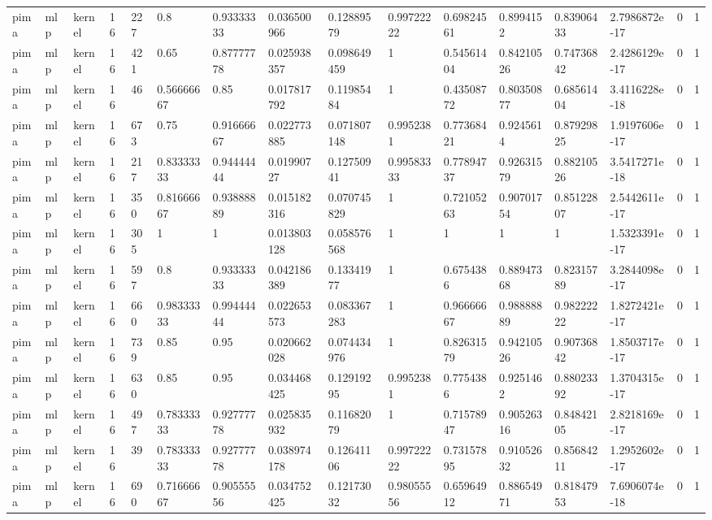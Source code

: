 \begin{tabular}{llllllllllllllll}
pima & mlp & kernel & 16 & 227 & 0.8 & 0.93333333 & 0.036500966 & 0.12889579 & 0.99722222 & 0.69824561 & 0.8994152 & 0.83906433 & 2.7986872e-17 & 0 & 1 \\
pima & mlp & kernel & 16 & 421 & 0.65 & 0.87777778 & 0.025938357 & 0.098649459 & 1 & 0.54561404 & 0.84210526 & 0.74736842 & 2.4286129e-17 & 0 & 1 \\
pima & mlp & kernel & 16 & 46 & 0.56666667 & 0.85 & 0.017817792 & 0.11985484 & 1 & 0.43508772 & 0.80350877 & 0.68561404 & 3.4116228e-18 & 0 & 1 \\
pima & mlp & kernel & 16 & 673 & 0.75 & 0.91666667 & 0.022773885 & 0.071807148 & 0.9952381 & 0.77368421 & 0.9245614 & 0.87929825 & 1.9197606e-17 & 0 & 1 \\
pima & mlp & kernel & 16 & 217 & 0.83333333 & 0.94444444 & 0.01990727 & 0.12750941 & 0.99583333 & 0.77894737 & 0.92631579 & 0.88210526 & 3.5417271e-18 & 0 & 1 \\
pima & mlp & kernel & 16 & 350 & 0.81666667 & 0.93888889 & 0.015182316 & 0.070745829 & 1 & 0.72105263 & 0.90701754 & 0.85122807 & 2.5442611e-17 & 0 & 1 \\
pima & mlp & kernel & 16 & 305 & 1 & 1 & 0.013803128 & 0.058576568 & 1 & 1 & 1 & 1 & 1.5323391e-17 & 0 & 1 \\
pima & mlp & kernel & 16 & 597 & 0.8 & 0.93333333 & 0.042186389 & 0.13341977 & 1 & 0.6754386 & 0.88947368 & 0.82315789 & 3.2844098e-17 & 0 & 1 \\
pima & mlp & kernel & 16 & 660 & 0.98333333 & 0.99444444 & 0.022653573 & 0.083367283 & 1 & 0.96666667 & 0.98888889 & 0.98222222 & 1.8272421e-17 & 0 & 1 \\
pima & mlp & kernel & 16 & 739 & 0.85 & 0.95 & 0.020662028 & 0.074434976 & 1 & 0.82631579 & 0.94210526 & 0.90736842 & 1.8503717e-17 & 0 & 1 \\
pima & mlp & kernel & 16 & 630 & 0.85 & 0.95 & 0.034468425 & 0.12919295 & 0.9952381 & 0.7754386 & 0.9251462 & 0.88023392 & 1.3704315e-17 & 0 & 1 \\
pima & mlp & kernel & 16 & 497 & 0.78333333 & 0.92777778 & 0.025835932 & 0.11682079 & 1 & 0.71578947 & 0.90526316 & 0.84842105 & 2.8218169e-17 & 0 & 1 \\
pima & mlp & kernel & 16 & 39 & 0.78333333 & 0.92777778 & 0.038974178 & 0.12641106 & 0.99722222 & 0.73157895 & 0.91052632 & 0.85684211 & 1.2952602e-17 & 0 & 1 \\
pima & mlp & kernel & 16 & 690 & 0.71666667 & 0.90555556 & 0.034752425 & 0.12173032 & 0.98055556 & 0.65964912 & 0.88654971 & 0.81847953 & 7.6906074e-18 & 0 & 1 \\

\end{tabular}
